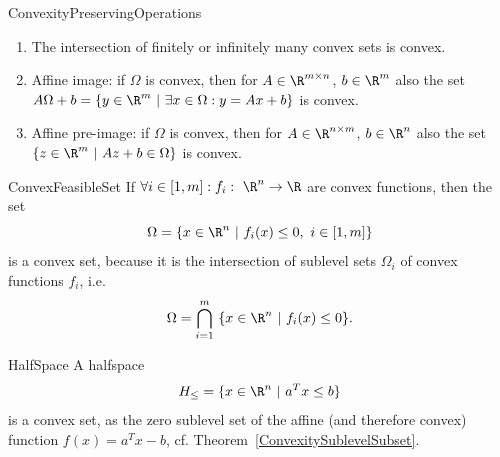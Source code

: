 \begin{pro}{ConvexityPreservingOperations}
    \begin{enumerate}
        \item The intersection of finitely or infinitely many convex sets is convex.
        \item Affine image: if $\Omega$ is convex, then for $A \in \R^{m \times n}$, $b \in \R^m$ also the set $A\Omega + b = \{ y \in \R^m \ | \ \exists x \in \Omega : y = Ax + b \}$ is convex.
        \item Affine pre-image: if $\Omega$ is convex, then for $A \in \R^{n \times m}$, $b \in \R^n$ also the set $\{ z \in \R^m \ | \ Az + b \in \Omega \}$ is convex.
    \end{enumerate}
\end{pro}

\begin{ex}{ConvexFeasibleSet}
    If $\forall i \in [1,m]: f_i : \ \R^n \rightarrow \R$ are convex functions, then the set 
    \begin{equation*}
        \Omega = \{x \in \R^n \ | \ f_i(x) \leq 0, \ i \in [1,m]\}
    \end{equation*}
    is a convex set, because it is the intersection of sublevel sets $\Omega_i$ of convex functions $f_i$, i\@.e\@.
    \begin{equation*}
        \Omega 
            = \bigcap_{i=1}^m \ \{x \in \R^n \ | \ f_i(x) \leq 0 \}.
    \end{equation*}
    \vspace{-0.5cm}
\end{ex}

\begin{ex}[Halfspace]{HalfSpace}
    A halfspace 
    \begin{equation*}
        H_{\leq} = \{ x \in \R^n \ | \ a^T x \leq b \}
    \end{equation*}
    is a convex set, as the zero sublevel set of the affine (and therefore convex) function $f(x) = a^T x - b$, cf. Theorem~\ref{ConvexitySublevelSubset}. 
\end{ex}

